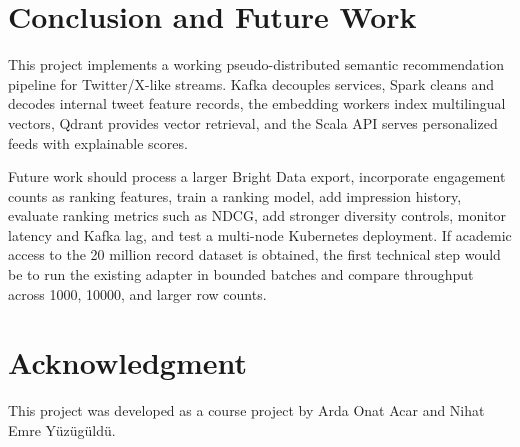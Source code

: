 \documentclass[conference]{IEEEtran}
\begin{document}
\section{Conclusion and Future Work}
This project implements a working pseudo-distributed semantic recommendation pipeline for Twitter/X-like streams. Kafka decouples services, Spark cleans and decodes internal tweet feature records, the embedding workers index multilingual vectors, Qdrant provides vector retrieval, and the Scala API serves personalized feeds with explainable scores.

Future work should process a larger Bright Data export, incorporate engagement counts as ranking features, train a ranking model, add impression history, evaluate ranking metrics such as NDCG, add stronger diversity controls, monitor latency and Kafka lag, and test a multi-node Kubernetes deployment. If academic access to the 20 million record dataset is obtained, the first technical step would be to run the existing adapter in bounded batches and compare throughput across 1000, 10000, and larger row counts.

\section*{Acknowledgment}
This project was developed as a course project by Arda Onat Acar and Nihat Emre Y\"uz\"ug\"uld\"u.
\end{document}
